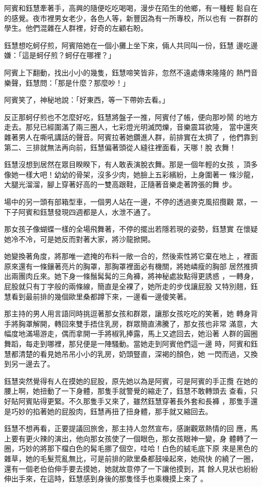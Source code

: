 阿賓和鈺慧牽著手，高興的隨便吃吃喝喝，漫步在陌生的他鄉，有一種輕
鬆自在的感覺。夜市裡男女老少，各色人等，新豐因為有一所專校，所以也有
一群群的學生。他們混雜在人群裡，好奇的左顧右盼。

鈺慧想吃蚵仔煎，阿賓陪她在一個小攤上坐下來，倆人共同叫一份，鈺慧
邊吃邊嫌：「這是蚵仔煎？蚵仔在哪裡？」

阿賓上下翻動，找出小小的幾隻，鈺慧啼笑皆非，忽然不遠處傳來隆隆的
熱門音樂聲，鈺慧問：「那是什麼？那麼吵！」

阿賓笑了，神秘地說：「好東西，等一下帶妳去看。」

反正那蚵仔煎也不怎麼好吃，鈺慧將盤子一推，阿賓付了帳，便向那吵鬧
的地方走去。那兒已經圍滿了兩三圈人，七彩燈光明滅閃爍，音樂震耳欲隆，
當中還夾雜著男人在嘶吼講話的聲音。阿賓拉著她鑽進人群，前排實在太擠了
，他們靠到第二、三排就無法再向前，鈺慧偏著頭從人縫往裡面看，天哪！脫
衣舞！

鈺慧沒想到居然在眾目睽睽下，有人敢表演脫衣舞。那是一個年輕的女孩
，頂多像她一樣大吧！幼幼的骨架，沒多少肉，她臉上五彩繽紛，上身圍著一
條沙龍，大腿光溜溜，腳上穿著好高的一雙高跟鞋，正隨著音樂走著誇張的舞
步。

場中的另一頭有部箱型車，一個男人站在一邊，不停的透過麥克風招攬觀
眾，一下子阿賓和鈺慧發現四週都是人，水泄不通了。

那女孩子像蝴蝶一樣的全場飛舞著，不停的擺出若隱若現的姿勢，鈺慧實
在懷疑她冷不冷，可是她反而對著大家，將沙龍掀開。

她變換著角度，將那唯一遮掩的布料一敞一合的，然後索性將它棄在地上
，裡面原來還有一條鑲著亮片的胸罩，那胸罩裡面必有機關，將她嶙瘦的胸部
居然推擠出兩團肉丘來。她下身一條鬚髯髯的三角褲，將神秘處妝點得更誘惑
，一轉身，屁股就只有丁字般的兩條線，簡直是全裸了，她所走的步伐讓屁股
又特別翹，鈺慧看到最前排的幾個歐里桑都蹲下來，一邊看一邊傻笑著。

那主持的男人用言語同時挑逗著那女孩和群眾，讓那女孩吃吃的笑著，她
轉身背手將胸罩解開，轉回來雙手捂住乳房，群眾簡直沸騰了，那女孩也非常
滿意，大幅度地滿場游走，偶而拿開一手將椒乳捧露，馬上又遮回去，她沿著
人群的圓圈舞蹈，每走到哪裡，那兒便是一陣騷動。當她走到阿賓他們這一邊
時，阿賓和鈺慧都清楚的看見她吊吊小小的乳房，奶頭豎直，深褐的顏色，她
一閃而過，又換到另一邊去了。

鈺慧突然覺得有人在摸她的屁股，原先她以為是阿賓，可是阿賓的手正攬
在她的腰上啊，她扭動了一下身體，那隻手就警覺的縮走了，鈺慧不敢轉頭去
查看，只好貼阿賓貼得更緊。不久那隻手又來了，雖然鈺慧穿著長外套和長褲
，那隻手還是巧妙的掐著她的屁股肉，鈺慧再扭了扭身體，那手就又縮回去。

鈺慧不想再看，正要提議回旅舍，那主持人忽然宣布，感謝觀眾熱情的回
應，馬上要有更火辣的演出，他向那女孩使了一個眼色，那女孩眼神一變，身
體轉了一圈，巧妙的將那下檔白色的髯毛挪了個空，哇哈！白色的絨毛底下原
來是黑色的雜草，她的毛髮荒亂無比，可是前排的歐里桑都鼓噪起來，她飛快
的繞了一圈，還有一個老伯伯伸手要去摸她，她就故意停了一下讓他摸到，其
餘人見狀也紛紛伸出手來，在這時，鈺慧感到身後的那隻怪手也乘機摸上來了
。

